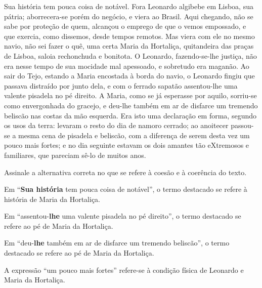 \begin{myquote}

Sua história tem pouca coisa de notável. Fora Leonardo
algibebe em Lisboa, sua pátria; aborrecera-se porém do negócio,
e viera ao Brasil. Aqui chegando, não se sabe por proteção de
quem, alcançou o emprego de que o vemos empossado, e que
exercia, como dissemos, desde tempos remotos. Mas viera com
ele no mesmo navio, não sei fazer o quê, uma certa Maria da
Hortaliça, quitandeira das praças de Lisboa, saloia rechonchuda e
bonitota. O Leonardo, fazendo-se-lhe justiça, não era nesse tempo
de sua mocidade mal apessoado, e sobretudo era maganão. Ao
sair do Tejo, estando a Maria encostada à borda do navio, o
Leonardo fingiu que passava distraído por junto dela, e com o
ferrado sapatão assentou-lhe uma valente pisadela no pé direito.
A Maria, como se já esperasse por aquilo, sorriu-se como
envergonhada do gracejo, e deu-lhe também em ar de disfarce um
tremendo beliscão nas costas da mão esquerda. Era isto uma
declaração em forma, segundo os usos da terra: levaram o resto
do dia de namoro cerrado; ao anoitecer passou-se a mesma cena
de pisadela e beliscão, com a diferença de serem desta vez um
pouco mais fortes; e no dia seguinte estavam os dois amantes tão
eXtremosos e familiares, que pareciam sê-lo de muitos anos.


\end{myquote}

Assinale a alternativa correta no que se refere à coesão e à coerência 
do texto. 

\begin{escolha}

\item
  Em ``\textbf{Sua história} tem pouca coisa de notável'', o termo destacado
  se refere à história de Maria da Hortaliça.
\item
  Em ``assentou-\textbf{lhe} uma valente pisadela no pé direito'', o termo destacado
  se refere ao pé de Maria da Hortaliça.
\item
  Em ``deu-\textbf{lhe} também em ar de disfarce um tremendo beliscão'', o termo 
  destacado se refere ao pé de Maria da Hortaliça.
\item
  A expressão ``um pouco mais fortes'' refere-se à condição física de Leonardo e 
  Maria da Hortaliça.

\end{escolha}

